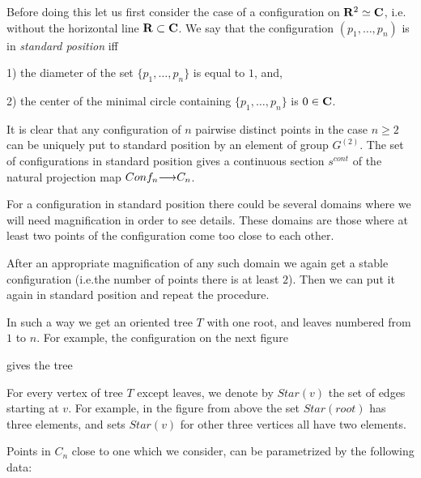     Before doing this let us first consider the case of a configuration
     on ${\bf R}^2\simeq {\bf C}$, i.e. without the horizontal line ${\bf R}\subset {\bf C}$.
     We say that the configuration $(p_1,\dots,p_n)$ is  
     in  {\it standard position} iff 
     
     1) the diameter  of the set $\{p_1,\dots,p_n\}$
      is equal to $1$, and,
      
      2) the center of the minimal circle containing 
      $\{p_1,\dots,p_n\}$ is $0\in {\bf C}$.
      
      It is clear that any configuration of $n$ pairwise distinct points
       in the case $n\ge 2$ can be uniquely put to  standard
        position by an element of group $G^{(2)}$.
         The set of configurations in standard position gives
          a continuous section $s^{cont}$
          of the natural projection map
           $Conf_n{\longrightarrow} C_n$.
           
      
       For a configuration in  standard position there could be several
     domains where we will need magnification in order to see details.
      These domains are those where at least two points of the
       configuration come too close to each other.
       
        
        After an appropriate magnification of any such  domain we again get
         a stable configuration (i.e.the  number of points there
         is at least $2$). 
         Then we can put it again in  standard position and repeat
         the procedure.
         
         In such a way we get an oriented tree $T$
         with one root, and leaves numbered
          from $1$ to $n$. For example, 
          the configuration on the next figure
          
          
          \vskip 1cm
         \centerline{
} \vskip 11mm
          gives the tree
          
        \vskip 1cm
         \centerline{
}
 \vskip 11mm
        
          For every vertex of  tree $T$ except leaves,
          we denote by $Star(v)$ the set of edges starting at $v$.
           For example, in the figure from above the set $Star(root)$
            has three elements, and sets $Star(v)$ for other three
             vertices all have two elements. 
          
          Points in $C_n$ close to one which we consider,
         can be parametrized by the following data:
         
